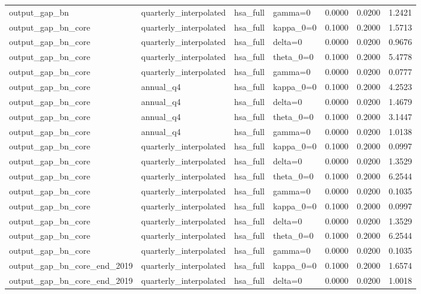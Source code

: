 \begin{tabular}{llllrrr}
output\_gap\_bn & quarterly\_interpolated & hsa\_full & gamma=0 & 0.0000 & 0.0200 & 1.2421 \\
output\_gap\_bn\_core & quarterly\_interpolated & hsa\_full & kappa\_0=0 & 0.1000 & 0.2000 & 1.5713 \\
output\_gap\_bn\_core & quarterly\_interpolated & hsa\_full & delta=0 & 0.0000 & 0.0200 & 0.9676 \\
output\_gap\_bn\_core & quarterly\_interpolated & hsa\_full & theta\_0=0 & 0.1000 & 0.2000 & 5.4778 \\
output\_gap\_bn\_core & quarterly\_interpolated & hsa\_full & gamma=0 & 0.0000 & 0.0200 & 0.0777 \\
output\_gap\_bn\_core & annual\_q4 & hsa\_full & kappa\_0=0 & 0.1000 & 0.2000 & 4.2523 \\
output\_gap\_bn\_core & annual\_q4 & hsa\_full & delta=0 & 0.0000 & 0.0200 & 1.4679 \\
output\_gap\_bn\_core & annual\_q4 & hsa\_full & theta\_0=0 & 0.1000 & 0.2000 & 3.1447 \\
output\_gap\_bn\_core & annual\_q4 & hsa\_full & gamma=0 & 0.0000 & 0.0200 & 1.0138 \\
output\_gap\_bn\_core & quarterly\_interpolated & hsa\_full & kappa\_0=0 & 0.1000 & 0.2000 & 0.0997 \\
output\_gap\_bn\_core & quarterly\_interpolated & hsa\_full & delta=0 & 0.0000 & 0.0200 & 1.3529 \\
output\_gap\_bn\_core & quarterly\_interpolated & hsa\_full & theta\_0=0 & 0.1000 & 0.2000 & 6.2544 \\
output\_gap\_bn\_core & quarterly\_interpolated & hsa\_full & gamma=0 & 0.0000 & 0.0200 & 0.1035 \\
output\_gap\_bn\_core & quarterly\_interpolated & hsa\_full & kappa\_0=0 & 0.1000 & 0.2000 & 0.0997 \\
output\_gap\_bn\_core & quarterly\_interpolated & hsa\_full & delta=0 & 0.0000 & 0.0200 & 1.3529 \\
output\_gap\_bn\_core & quarterly\_interpolated & hsa\_full & theta\_0=0 & 0.1000 & 0.2000 & 6.2544 \\
output\_gap\_bn\_core & quarterly\_interpolated & hsa\_full & gamma=0 & 0.0000 & 0.0200 & 0.1035 \\
output\_gap\_bn\_core\_end\_2019 & quarterly\_interpolated & hsa\_full & kappa\_0=0 & 0.1000 & 0.2000 & 1.6574 \\
output\_gap\_bn\_core\_end\_2019 & quarterly\_interpolated & hsa\_full & delta=0 & 0.0000 & 0.0200 & 1.0018 \\

\end{tabular}
